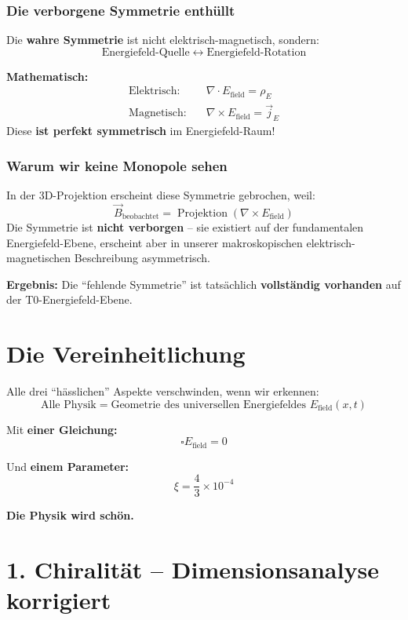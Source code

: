 	\subsubsection*{Die verborgene Symmetrie enthüllt}
	
	Die \textbf{wahre Symmetrie} ist nicht elektrisch-magnetisch, sondern:
	\[
	\boxed{\text{Energiefeld-Quelle} \;\leftrightarrow\; \text{Energiefeld-Rotation}}
	\]
	
	\textbf{Mathematisch:}
	\begin{align*}
		\text{Elektrisch:} \quad &\nabla \cdot E_{\text{field}} = \rho_E \\
		\text{Magnetisch:} \quad &\nabla \times E_{\text{field}} = \vec{j}_E
	\end{align*}
	Diese \textbf{ist perfekt symmetrisch} im Energiefeld-Raum!
	
	\subsubsection*{Warum wir keine Monopole sehen}
	
	In der 3D-Projektion erscheint diese Symmetrie gebrochen, weil:
	\[
	\vec{B}_{\text{beobachtet}} = \operatorname{Projektion}(\nabla \times E_{\text{field}})
	\]
	Die Symmetrie ist \textbf{nicht verborgen} – sie existiert auf der fundamentalen Energiefeld-Ebene, erscheint aber in unserer makroskopischen elektrisch-magnetischen Beschreibung asymmetrisch.
	
	\textbf{Ergebnis:} Die ``fehlende Symmetrie'' ist tatsächlich \textbf{vollständig vorhanden} auf der T0-Energiefeld-Ebene.
	
	
	
	\section*{Die Vereinheitlichung}
	
	Alle drei ``hässlichen'' Aspekte verschwinden, wenn wir erkennen:
	\[
	\boxed{\text{Alle Physik} = \text{Geometrie des universellen Energiefeldes } E_{\text{field}}(x,t)}
	\]
	
	Mit \textbf{einer Gleichung:}
	\[
	\square E_{\text{field}} = 0
	\]
	
	Und \textbf{einem Parameter:}
	\[
	\xi = \frac{4}{3} \times 10^{-4}
	\]
	
	\textbf{Die Physik wird schön.}
	
	\section*{1. Chiralität -- Dimensionsanalyse korrigiert}
	
